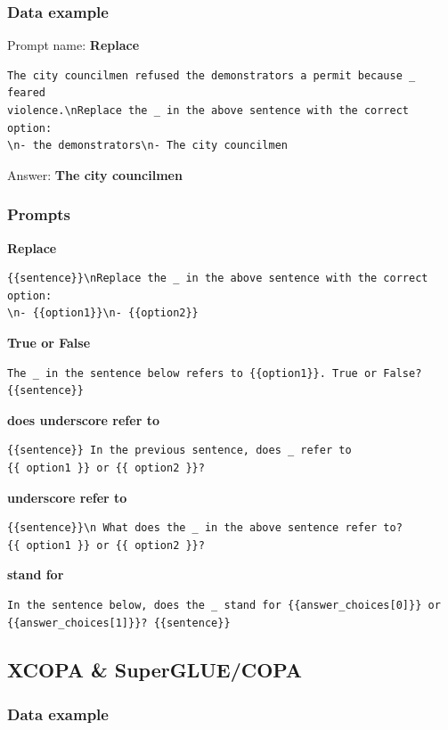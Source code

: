 \documentclass[twoside,11pt]{article}
\begin{document}
\subsubsection{Data example}

Prompt name: \textbf{Replace}
\begin{verbatim}
The city councilmen refused the demonstrators a permit because _ feared 
violence.\nReplace the _ in the above sentence with the correct option: 
\n- the demonstrators\n- The city councilmen
\end{verbatim}
Answer: \textbf{The city councilmen}

\subsubsection{Prompts}

\textbf{Replace}
\begin{verbatim}
{{sentence}}\nReplace the _ in the above sentence with the correct option:
\n- {{option1}}\n- {{option2}}
\end{verbatim}

\noindent\textbf{True or False}
\begin{verbatim}
The _ in the sentence below refers to {{option1}}. True or False? 
{{sentence}}
\end{verbatim}

\noindent\textbf{does underscore refer to}
\begin{verbatim}
{{sentence}} In the previous sentence, does _ refer to 
{{ option1 }} or {{ option2 }}?
\end{verbatim}

\noindent\textbf{underscore refer to}
\begin{verbatim}
{{sentence}}\n What does the _ in the above sentence refer to? 
{{ option1 }} or {{ option2 }}?
\end{verbatim}

\noindent\textbf{stand for}
\begin{verbatim}
In the sentence below, does the _ stand for {{answer_choices[0]}} or 
{{answer_choices[1]}}? {{sentence}}
\end{verbatim}

\subsection{XCOPA \& SuperGLUE/COPA}

\subsubsection{Data example}
\end{document}
